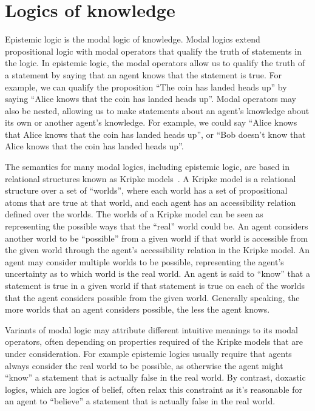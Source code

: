 \section{Logics of knowledge}

Epistemic logic is the modal logic of knowledge.
Modal logics extend propositional logic with modal operators that qualify the truth of statements in the logic.
In epistemic logic, the modal operators allow us to qualify the truth of a statement by saying that an agent knows that the statement is true.
For example, we can qualify the proposition ``The coin has landed heads up'' by saying ``Alice knows that the coin has landed heads up''.
Modal operators may also be nested, allowing us to make statements about an agent's knowledge about its own or another agent's knowledge.
For example, we could say ``Alice knows that Alice knows that the coin has landed heads up'', or ``Bob doesn't know that Alice knows that the coin has landed heads up''.

The semantics for many modal logics, including epistemic logic, are based in relational structures known as Kripke models~\cite{kripke:1963,blackburn:2001}.
A Kripke model is a relational structure over a set of ``worlds'', where each world has a set of propositional atoms that are true at that world, and each agent has an accessibility relation defined over the worlds.
The worlds of a Kripke model can be seen as representing the possible ways that the ``real'' world could be.
An agent considers another world to be ``possible'' from a given world if that world is accessible from the given world through the agent's accessibility relation in the Kripke model.
An agent may consider multiple worlds to be possible, representing the agent's uncertainty as to which world is the real world.
An agent is said to ``know'' that a statement is true in a given world if that statement is true on each of the worlds that the agent considers possible from the given world.
Generally speaking, the more worlds that an agent considers possible, the less the agent knows.

Variants of modal logic may attribute different intuitive meanings to its modal operators, often depending on properties required of the Kripke models that are under consideration.
For example epistemic logics usually require that agents always consider the real world to be possible, as otherwise the agent might ``know'' a statement that is actually false in the real world.
By contrast, doxastic logics, which are logics of belief, often relax this constraint as it's reasonable for an agent to ``believe'' a statement that is actually false in the real world.

